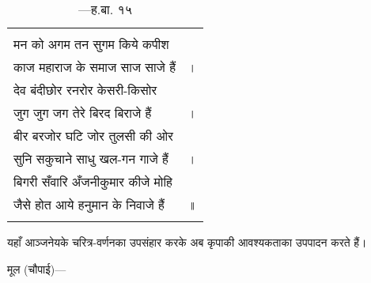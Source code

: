 {\bfseries
\setlength{\mylenone}{0pt}
\settowidth{\mylentwo}{मन को अगम तन सुगम किये कपीश}
\setlength{\mylenone}{\maxof{\mylenone}{\mylentwo}}
\settowidth{\mylentwo}{काज महाराज के समाज साज साजे हैं}
\setlength{\mylenone}{\maxof{\mylenone}{\mylentwo}}
\settowidth{\mylentwo}{देव बंदीछोर रनरोर केसरी-किसोर}
\setlength{\mylenone}{\maxof{\mylenone}{\mylentwo}}
\settowidth{\mylentwo}{जुग जुग जग तेरे बिरद बिराजे हैं}
\setlength{\mylenone}{\maxof{\mylenone}{\mylentwo}}
\settowidth{\mylentwo}{बीर बरजोर घटि जोर तुलसी की ओर}
\setlength{\mylenone}{\maxof{\mylenone}{\mylentwo}}
\settowidth{\mylentwo}{सुनि सकुचाने साधु खल-गन गाजे हैं}
\setlength{\mylenone}{\maxof{\mylenone}{\mylentwo}}
\settowidth{\mylentwo}{बिगरी सँवारि अँजनीकुमार कीजे मोहि}
\setlength{\mylenone}{\maxof{\mylenone}{\mylentwo}}
\settowidth{\mylentwo}{जैसे होत आये हनुमान के निवाजे हैं}
\setlength{\mylenone}{\maxof{\mylenone}{\mylentwo}}
\setlength{\mylentwo}{\baselineskip}
\setlength{\mylenone}{\mylenone + 1pt}
\begin{longtable}[l]{@{\hspace*{\mylen}}>{\setlength\parfillskip{0pt}}p{\mylenone}@{}@{}l@{}}
 & \\[-\the\mylentwo]
मन को अगम तन सुगम किये कपीश & \\ \nopagebreak
काज महाराज के समाज साज साजे हैं & ।\\
देव बंदीछोर रनरोर केसरी-किसोर & \\ \nopagebreak
जुग जुग जग तेरे बिरद बिराजे हैं & ।\\
बीर बरजोर घटि जोर तुलसी की ओर & \\ \nopagebreak
सुनि सकुचाने साधु खल-गन गाजे हैं & ।\\
बिगरी सँवारि अँजनीकुमार कीजे मोहि & \\ \nopagebreak
जैसे होत आये हनुमान के निवाजे हैं & ॥\\ \nopagebreak
\caption*{—ह.बा. १५}
\end{longtable}
}
\begin{sloppypar}\justifying{}
यहाँ आञ्जनेयके चरित्र-वर्णनका उपसंहार करके अब कृपाकी आवश्यकताका उपपादन करते हैं।
\end{sloppypar}
\paraseplotus
\pagebreak


{}
\begin{sloppypar}\justifying{}
मूल (चौपाई)—
\end{sloppypar}

